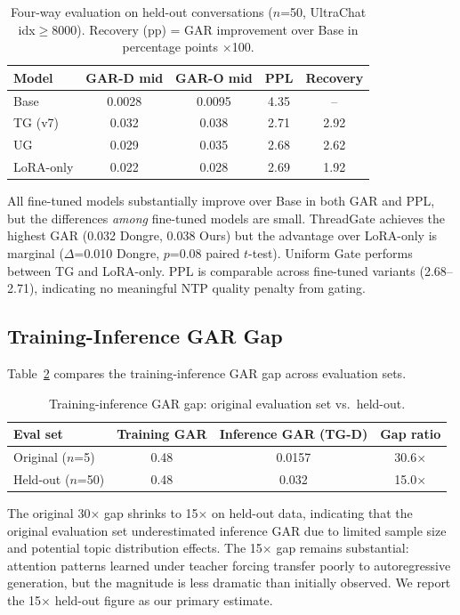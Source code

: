 \documentclass[11pt,a4paper]{article}
\begin{document}
\begin{table}[h]
\centering
\caption{Four-way evaluation on held-out conversations ($n$=50, UltraChat idx$\geq$8000). Recovery (pp) = GAR improvement over Base in percentage points $\times$100.}
\label{tab:heldout_4way}
\begin{tabular}{lcccc}
\toprule
Model & GAR-D mid & GAR-O mid & PPL & Recovery \\
\midrule
Base       & 0.0028 & 0.0095 & 4.35 & -- \\
TG (v7)    & 0.032  & 0.038  & 2.71 & 2.92 \\
UG         & 0.029  & 0.035  & 2.68 & 2.62 \\
LoRA-only  & 0.022  & 0.028  & 2.69 & 1.92 \\
\bottomrule
\end{tabular}
\end{table}

All fine-tuned models substantially improve over Base in both GAR and PPL, but the differences \emph{among} fine-tuned models are small. ThreadGate achieves the highest GAR (0.032 Dongre, 0.038 Ours) but the advantage over LoRA-only is marginal ($\Delta$=0.010 Dongre, $p$=0.08 paired $t$-test). Uniform Gate performs between TG and LoRA-only. PPL is comparable across fine-tuned variants (2.68--2.71), indicating no meaningful NTP quality penalty from gating.

\subsection{Training-Inference GAR Gap}

Table~\ref{tab:gap} compares the training-inference GAR gap across evaluation sets.

\begin{table}[h]
\centering
\caption{Training-inference GAR gap: original evaluation set vs.\ held-out.}
\label{tab:gap}
\begin{tabular}{lccc}
\toprule
Eval set & Training GAR & Inference GAR (TG-D) & Gap ratio \\
\midrule
Original ($n$=5)   & 0.48 & 0.0157 & 30.6$\times$ \\
Held-out ($n$=50)  & 0.48 & 0.032  & 15.0$\times$ \\
\bottomrule
\end{tabular}
\end{table}

The original 30$\times$ gap shrinks to 15$\times$ on held-out data, indicating that the original evaluation set underestimated inference GAR due to limited sample size and potential topic distribution effects. The 15$\times$ gap remains substantial: attention patterns learned under teacher forcing transfer poorly to autoregressive generation, but the magnitude is less dramatic than initially observed. We report the 15$\times$ held-out figure as our primary estimate.
\end{document}
